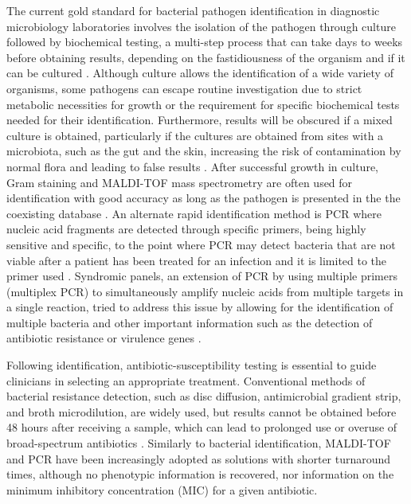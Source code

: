 The current gold standard for bacterial pathogen identification in diagnostic microbiology laboratories involves the isolation of the pathogen through culture followed by biochemical testing, a multi-step process that can take days to weeks before obtaining results, depending on the fastidiousness of the organism and if it can be cultured \citep{muhamad_rizal_advantages_2020, giuliano_guide_2019, muhamad_rizal_advantages_2020}. 
Although culture allows the identification of a wide variety of organisms, some pathogens can escape routine investigation due to strict metabolic necessities for growth or the requirement for specific biochemical tests needed for their identification. 
Furthermore, results will be obscured if a mixed culture is obtained, particularly if the cultures are obtained from sites with a microbiota, such as the gut and the skin, increasing the risk of contamination by normal flora and leading to false results \citep{giuliano_guide_2019}. 
After successful growth in culture, Gram staining and MALDI-TOF mass spectrometry are often used for identification with good accuracy as long as the pathogen is presented in the the coexisting database \citep{patel_maldi-tof_2015}. 
An alternate rapid identification method is \ac{PCR} where nucleic acid fragments are detected through specific primers, being highly sensitive and specific, to the point where \ac{PCR} may detect bacteria that are not viable after a patient has been treated for an infection and it is limited to the primer used \citep{scerbo_beyond_2016}. 
Syndromic panels, an extension of \ac{PCR} by using multiple primers (multiplex \ac{PCR}) to simultaneously amplify nucleic acids from multiple targets in a single reaction, tried to address this issue by allowing for the identification of multiple bacteria and other important information such as the detection of antibiotic resistance or virulence genes \citep{giuliano_guide_2019}.

Following identification, antibiotic-susceptibility testing is essential to guide clinicians in selecting an appropriate treatment. 
Conventional methods of bacterial resistance detection, such as disc diffusion, antimicrobial gradient strip, and broth microdilution, are widely used, but results cannot be obtained before 48 hours after receiving a sample, which can lead to prolonged use or overuse of broad-spectrum antibiotics \citep{benkova_antimicrobial_2020}. 
Similarly to bacterial identification, MALDI-TOF and \ac{PCR} have been increasingly adopted as solutions with shorter turnaround times, although no phenotypic information is recovered, nor information on the minimum inhibitory concentration (MIC) for a given antibiotic.   


